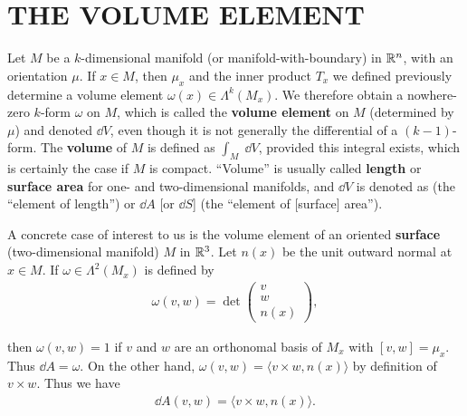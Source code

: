 \clearpage
\section[\textsc{the volume element}]{THE VOLUME ELEMENT}
Let $M$ be a $k$-dimensional manifold (or manifold-with-boundary) in $\mathbb{R}^n$, 
with an orientation $\mu$. If $x\in M$, then $\mu_x$ and the inner product $T_x$ we defined 
previously determine a volume element $\omega(x) \in \Lambda^k(M_x)$. We therefore obtain a 
nowhere-zero $k$-form $\omega$ on $M$, which is called the \textbf{volume element} on $M$ 
(determined by $\mu$) and denoted $\dd V$, even though it is not generally the differential 
of a $(k-1)$-form. The \textbf{volume} of $M$ is defined as $\int_M \;\dd V$, provided this integral 
exists, which is certainly the case if $M$ is compact. ``Volume'' is usually called \textbf{length} or 
\textbf{surface area} for one- and two-dimensional manifolds, and $\dd V$ is denoted as 
(the ``element of length'') or 
$\dd A$ [or $\dd S$] (the ``element of [surface] area'').

A concrete case of interest to us is the volume element of an oriented \textbf{surface} 
(two-dimensional manifold) $M$ in $\mathbb{R}^3$. Let $n(x)$ be the unit outward normal at
$x\in M$. If $\omega\in \Lambda^2(M_x)$ is defined by 
\begin{align*}
  \omega(v, w) = \det \begin{pmatrix}v\\ w\\ n(x)\end{pmatrix},
\end{align*} 

then $\omega(v,w)=1$ if $v$ and $w$ are an orthonomal basis of $M_x$ with $[v, w]=\mu_x$. 
Thus $\dd A=\omega$. On the other hand, $\omega(v, w)=\langle v\times w, n(x)\rangle$ by definition
of $v\times w$. Thus we have 
\begin{align*}
    \dd A(v, w) = \langle v\times w, n(x)\rangle.
\end{align*}

